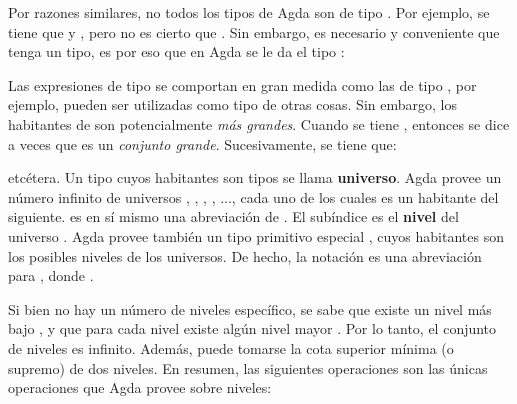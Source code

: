 Por razones similares, no todos los tipos de Agda son de tipo . Por ejemplo, se tiene que  \AgdaSymbol{:}  y  \AgdaSymbol{:} , pero no es cierto que  \AgdaSymbol{:} . Sin embargo, es necesario y conveniente que  tenga un tipo, es por eso que en Agda se le da el tipo :

 \AgdaSymbol{:} 

Las expresiones de tipo  se comportan en gran medida como las de tipo , por ejemplo, pueden ser utilizadas como tipo de otras cosas. Sin embargo, los habitantes de  son potencialmente \textit{más grandes}. Cuando se tiene  \AgdaSymbol{:} , entonces se dice a veces que  es un \textit{conjunto grande}. Sucesivamente, se tiene que:

 \AgdaSymbol{:}  

 \AgdaSymbol{:} 

etcétera. Un tipo cuyos habitantes son tipos se llama \textbf{universo}. Agda provee un número infinito de universos , , , , ..., cada uno de los cuales es un habitante del siguiente.  es en sí mismo una abreviación de . El subíndice  es el \textbf{nivel} del universo . Agda provee también un tipo primitivo especial , cuyos habitantes son los posibles niveles de los universos. De hecho, la notación  es una abreviación para , donde  \AgdaSymbol{:} . 

Si bien no hay un número de niveles específico, se sabe que existe un nivel más bajo , y que para cada nivel  existe algún nivel mayor  . Por lo tanto, el conjunto de niveles es infinito. Además, puede tomarse la cota superior mínima (o supremo)  de dos niveles. En resumen, las siguientes operaciones son las únicas operaciones que Agda provee sobre niveles:

